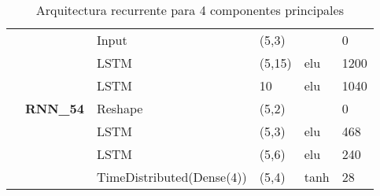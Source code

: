 \begin{table}[H]
\begin{center}
\begin{tabular}{ll|l|l|l|l|}
\multicolumn{1}{|l|}{}                                                                 & \multirow{7}{*}{\textbf{RNN\_54}} & Input                              & (5,3)                                &                                          & 0                                           \\ \cline{3-6} 
\multicolumn{1}{|l|}{}                                                                 &                                   & LSTM                               & (5,15)                               & elu                                     & 1200                                        \\ \cline{3-6} 
\multicolumn{1}{|l|}{}                                                                 &                                   & LSTM                               & 10                                   & elu                                     & 1040                                        \\ \cline{3-6} 
\multicolumn{1}{|l|}{}                                                                 &                                   & Reshape                            & (5,2)                                &                                          & 0                                           \\ \cline{3-6} 
\multicolumn{1}{|l|}{}                                                                 &                                   & LSTM                               & (5,3)                                & elu                                     & 468                                         \\ \cline{3-6} 
\multicolumn{1}{|l|}{}                                                                 &                                   & LSTM                               & (5,6)                                & elu                                     & 240                                         \\ \cline{3-6} 
\multicolumn{1}{|l|}{}                                                                 &                                   & TimeDistributed(Dense(4))          & (5,4)                                & tanh                                     & 28                                          \\ \hline
\end{tabular}

\end{center}
\caption{Arquitectura recurrente para 4 componentes principales}
\label{table:rnn_4}
\end{table}